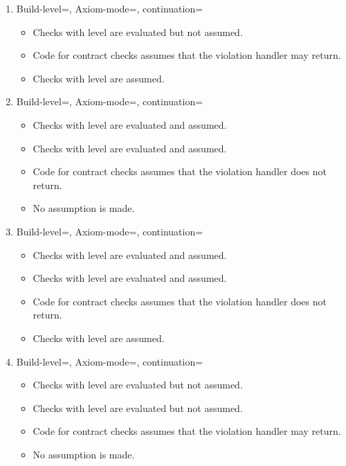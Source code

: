 \begin{enumerate}
\item Build-level=, Axiom-mode=, continuation=
\begin{itemize}
  \item Checks with  level are evaluated but not assumed.
  \item Code for contract checks assumes that the violation handler may return.
  \item Checks with  level are assumed.
\end{itemize}

\item Build-level=, Axiom-mode=, continuation=
\begin{itemize}
  \item Checks with  level are evaluated and assumed.
  \item Checks with  level are evaluated and assumed.
  \item Code for contract checks assumes that the violation handler does not return.
  \item No assumption is made.
\end{itemize}

\item Build-level=, Axiom-mode=, continuation=
\begin{itemize}
  \item Checks with  level are evaluated and assumed.
  \item Checks with  level are evaluated and assumed.
  \item Code for contract checks assumes that the violation handler does not return.
  \item Checks with  level are assumed.
\end{itemize}

\item Build-level=, Axiom-mode=, continuation=
\begin{itemize}
  \item Checks with  level are evaluated but not assumed.
  \item Checks with  level are evaluated but not assumed.
  \item Code for contract checks assumes that the violation handler may return.
  \item No assumption is made.
\end{itemize}


\end{enumerate}
